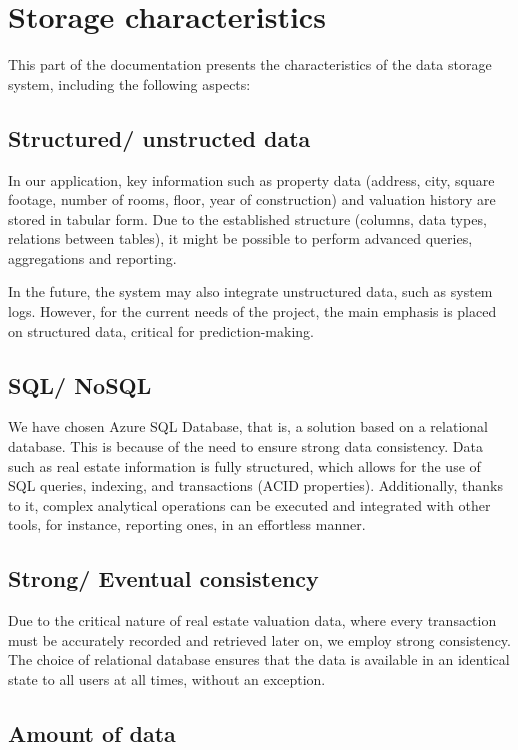 \documentclass{article}
\begin{document}
\section{Storage characteristics}

This part of the documentation presents the characteristics of the data storage system, including the following aspects:

\subsection{Structured/ unstructed data}

In our application, key information such as property data (address, city, square footage, number of rooms, floor, year of construction) and valuation history are stored in tabular form. Due to the established structure (columns, data types, relations between tables), it might be possible to perform advanced queries, aggregations and reporting.

In the future, the system may also integrate unstructured data, such as system logs. However, for the current needs of the project, the main emphasis is placed on structured data, critical for prediction-making. 

\subsection{SQL/ NoSQL}

We have chosen Azure SQL Database, that is, a solution based on a relational database. This is because of the need to ensure strong data consistency. Data such as real estate information is fully structured, which allows for the use of SQL queries, indexing, and transactions (ACID properties). Additionally, thanks to it, complex analytical operations can be executed and integrated with other tools, for instance, reporting ones, in an effortless manner. 


\subsection{Strong/ Eventual consistency}

Due to the critical nature of real estate valuation data, where every transaction must be accurately recorded and retrieved later on, we employ strong consistency. The choice of relational database ensures that the data is available in an identical state to all users at all times, without an exception.

\subsection{Amount of data}
\end{document}
